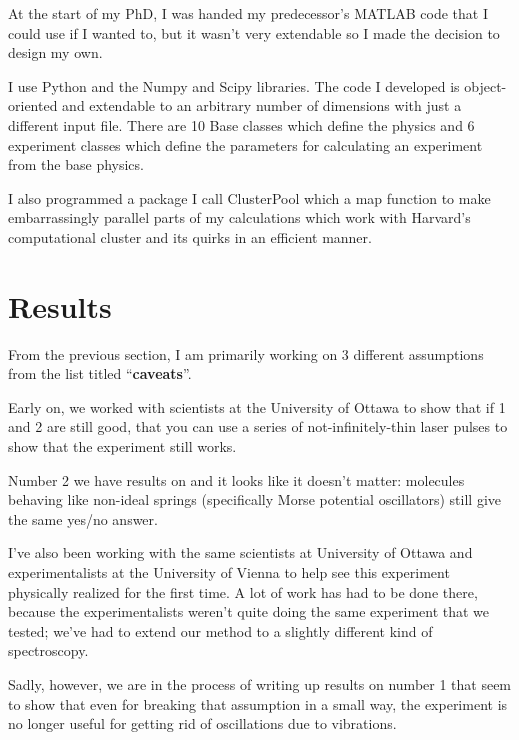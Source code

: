 At the start of my PhD, I was handed my predecessor's MATLAB code that I could use if I wanted to, but it wasn't very extendable so I made the decision to design my own.

I use Python and the Numpy and Scipy libraries.  The code I developed is object-oriented and extendable to an arbitrary number of dimensions with just a different input file.  There are 10 Base classes which define the physics and 6 experiment classes which define the parameters for calculating an experiment from the base physics.

I also programmed a package I call ClusterPool which a map function to make embarrassingly parallel parts of my calculations which work with Harvard's computational cluster and its quirks in an efficient manner.

\section{Results}
From the previous section, I am primarily working on 3 different assumptions from the list titled ``\textbf{caveats}''.

Early on, we worked with scientists at the University of Ottawa to show that if 1 and 2 are still good, that you can use a series of not-infinitely-thin laser pulses to show that the experiment still works\cite{allanWitness}.

Number 2 we have results on and it looks like it doesn't matter: molecules behaving like non-ideal springs (specifically Morse potential oscillators) still give the same yes/no answer.

I've also been working with the same scientists at University of Ottawa and experimentalists at the University of Vienna to help see this experiment physically realized for the first time.  A lot of work has had to be done there, because the experimentalists weren't quite doing the same experiment that we tested; we've had to extend our method to a slightly different kind of spectroscopy.

Sadly, however, we are in the process of writing up results on number 1 that seem to show that even for breaking that assumption in a small way, the experiment is no longer useful for getting rid of oscillations due to vibrations.


